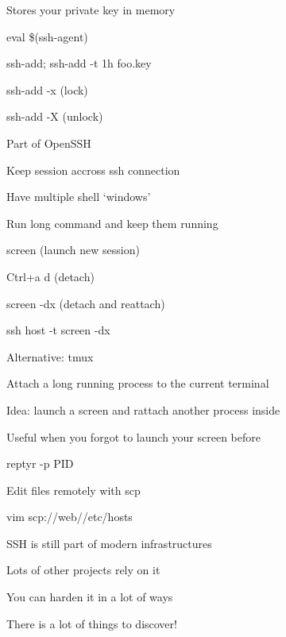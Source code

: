 \begin{iframe}
\item Stores your private key in memory
\item eval \$(ssh-agent)
\item ssh-add; ssh-add -t 1h foo.key
\item ssh-add -x (lock)
\item ssh-add -X (unlock)
\item Part of OpenSSH
\end{iframe}
\begin{iframe}[screen]
\item Keep session accross ssh connection
\item Have multiple shell `windows'
\item Run long command and keep them running
\item screen (launch new session)
\item Ctrl+a d (detach)
\item screen -dx (detach and reattach)
\item ssh host -t screen -dx
\item Alternative: tmux
\end{iframe}
\begin{iframe}[reptyr]
\item Attach a long running process to the current terminal
\item Idea: launch a screen and rattach another process inside
\item Useful when you forgot to launch your screen before
\item reptyr -p PID
\end{iframe}

\begin{iframe}[vim]
\item Edit files remotely with scp
\item vim scp://web//etc/hosts
\end{iframe}

\begin{iframe}[Conclusion]
    \item SSH is still part of modern infrastructures
    \item Lots of other projects rely on it
    \item You can harden it in a lot of ways
    \item There is a lot of things to discover!
    \end{iframe}

